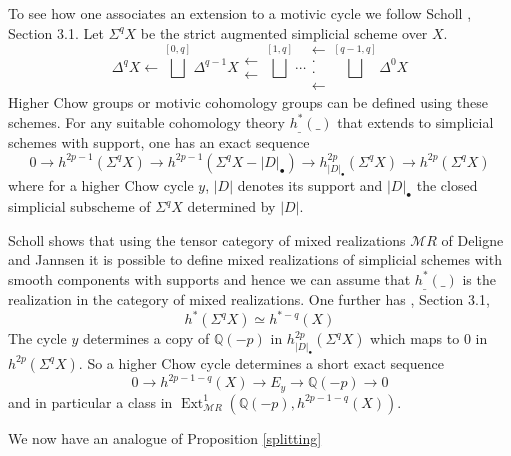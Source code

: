 \documentclass[12pt,reqno]{article}
\newcommand {\Q}{{\mathds Q}}
\newcommand {\MMR}{{\mathcal MR}}
\def\Ext{\operatorname{Ext}}
\begin{document}
To see how one associates an extension to a motivic cycle we follow Scholl \cite{scholl}, Section 3.1. Let $\Sigma^qX$ be the strict augmented simplicial scheme over $X$. 
%
$$\Delta^q X \leftarrow \bigsqcup^{[0,q]} \Delta^{q-1}X \mathrel{\substack{\leftarrow \\ \leftarrow}} \bigsqcup^{[1,q]} \cdots  \mathrel{\substack{\leftarrow \\ \cdot \\ \cdot  \\ \leftarrow}} \bigsqcup^{[q-1,q]} \Delta^0 X   $$
%
Higher Chow groups or motivic cohomology groups can be defined using these schemes. For any suitable cohomology theory $h^*_{\_}(\_)$ that extends to simplicial schemes with support, one has an exact sequence 
%
$$0 \rightarrow h^{2p-1}(\Sigma^q X) \rightarrow h^{2p-1}(\Sigma^q X-|D|_{\bullet})\rightarrow h^{2p}_{|D|_{\bullet}}(\Sigma^q X) \rightarrow h^{2p}(\Sigma^q X) $$
%
where for a higher Chow cycle $y$, $|D|$ denotes its support and $|D|_{\bullet}$ the closed simplicial subscheme of $\Sigma^q X$ determined by $|D|$. 

Scholl shows that using the tensor category of mixed realizations $\MMR$ of Deligne and Jannsen \cite{jann} it is possible to define mixed realizations of simplicial schemes with smooth components with supports and hence we can assume that $h^*_{\_}(\_)$ is the realization in the category of mixed realizations. One further has  \cite{scholl}, Section 3.1,
%
$$h^{*}(\Sigma^q X) \simeq h^{*-q}(X)$$ 
%
The cycle $y$ determines a copy of $\Q(-p)$ in $h^{2p}_{|D|_{\bullet}}(\Sigma^q X)$ which maps to $0$ in $h^{2p}(\Sigma^q X)$. So a higher Chow cycle determines a short exact sequence 
%
$$0 \rightarrow h^{2p-1-q}(X) \rightarrow E_y \rightarrow \Q(-p) \rightarrow 0$$
%
and in particular a class in $\Ext^1_{\MMR}(\Q(-p),h^{2p-1-q}(X))$. 


We now have an analogue of Proposition \ref{splitting}
\end{document}
